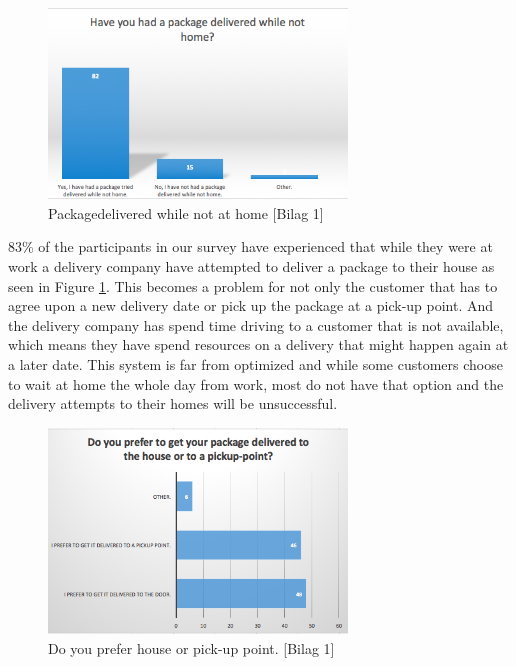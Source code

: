 \documentclass[12pt]{report}
\begin{document}
\begin{figure}[H]
  \centering
  \includegraphics[width=300]{pics/packagedeliverednothome.png}
  \caption{Packagedelivered while not at home [Bilag 1]}
  \label{fig: survey1}
\end{figure}

 83\% of the participants in our survey have experienced that while they were at work a delivery company have attempted to deliver a package to their house as seen in Figure \ref{fig: survey1}. This becomes a problem for not only the customer that has to agree upon a new delivery date or pick up the package at a pick-up point. And the delivery company has spend time driving to a customer that is not available, which means they have spend resources on a delivery that might happen again at a later date. This system is far from optimized and while some customers choose to wait at home the whole day from work, most do not have that option and the delivery attempts to their homes will be unsuccessful.

\begin{figure}[H]
  \centering
  \includegraphics[width=300]{pics/houseorpickuppoint.png}
  \caption{Do you prefer house or pick-up point. [Bilag 1]}
  \label{fig: survey2}
\end{figure}
\end{document}
